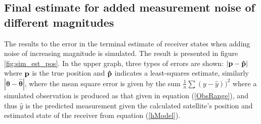 \subsection{Final estimate for added measurement noise of different magnitudes}
The results to the error in the terminal estimate of receiver states when adding noise of increasing magnitude is simulated. The result is presented in figure \ref{fig:sim_est_pos}. In the upper graph, three types of errors are shown: $|\bf p-\hat{p}|$ where $\bf p$ is the true position and $\bf \hat{p}$ indicates a least-squares estimate, similarly $|{\boldsymbol \theta}-\hat{{\boldsymbol \theta}}|$, where the mean square error is given by the sum $\frac{1}{n}\sum (y-\hat{y}))^2$ where a simulated observation is produced as that given in equation (\ref{ObsRange}), and thus $\hat{y}$ is the predicted measurement given the calculated satellite's position and estimated state of the receiver from equation (\ref{hModel}). \\
